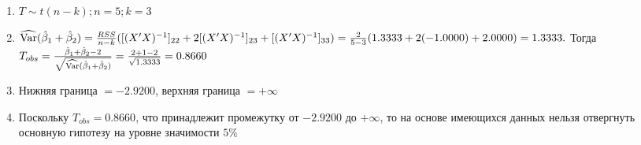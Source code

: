 \documentclass[pdftex,11pt,openany]{book}\usepackage[]{graphicx}\usepackage[]{color}
\begin{document}
\begin{solution}
\begin{enumerate}
\begin{enumerate}
\item $T \sim t(n-k); n = 5; k = 3$
\item $\widehat{\operatorname{Var}}(\hat{\beta}_1 + \hat{\beta}_2) = \frac{RSS}{n - k}([(X'X)^{-1}]_{22} + 2[(X'X)^{-1}]_{23} + [(X'X)^{-1}]_{33}) = \frac{2}{5 - 3} (1.3333 + 2(-1.0000) + 2.0000) = 1.3333.$ Тогда $T_{obs} = \frac{\hat{\beta}_1 + \hat{\beta}_2 - 2}{\sqrt{\widehat{\operatorname{Var}}(\hat{\beta}_1 + \hat{\beta}_2)}} = \frac{2 + 1 - 2}{\sqrt{1.3333}} = 0.8660$
\item Нижняя граница $= - 2.9200$, верхняя граница $= + \infty$
\item Поскольку $T_{obs} = 0.8660$, что принадлежит промежутку от $-  2.9200$ до $+ \infty$, то на основе имеющихся данных нельзя отвергнуть основную гипотезу на уровне значимости $5\%$
\end{enumerate}
\end{enumerate}
\end{solution}
\end{document}
